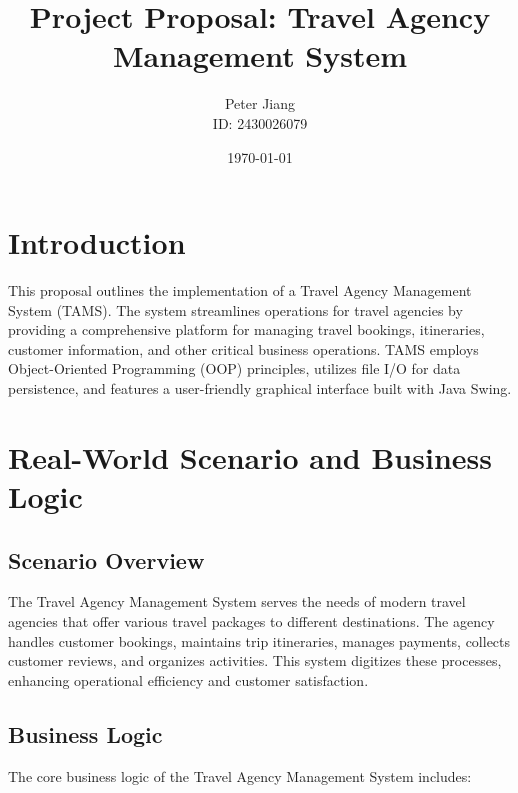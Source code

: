 \documentclass[12pt]{article}
\title{\textbf{Project Proposal: Travel Agency Management System}}
\author{Peter Jiang \\ ID: 2430026079}
\date{\today}
\begin{document}
\maketitle

\section{Introduction}
This proposal outlines the implementation of a Travel Agency Management System (TAMS). The system streamlines operations for travel agencies by providing a comprehensive platform for managing travel bookings, itineraries, customer information, and other critical business operations. TAMS employs Object-Oriented Programming (OOP) principles, utilizes file I/O for data persistence, and features a user-friendly graphical interface built with Java Swing.

\section{Real-World Scenario and Business Logic}

\subsection{Scenario Overview}
The Travel Agency Management System serves the needs of modern travel agencies that offer various travel packages to different destinations. The agency handles customer bookings, maintains trip itineraries, manages payments, collects customer reviews, and organizes activities. This system digitizes these processes, enhancing operational efficiency and customer satisfaction.

\subsection{Business Logic}
The core business logic of the Travel Agency Management System includes:
\end{document}
